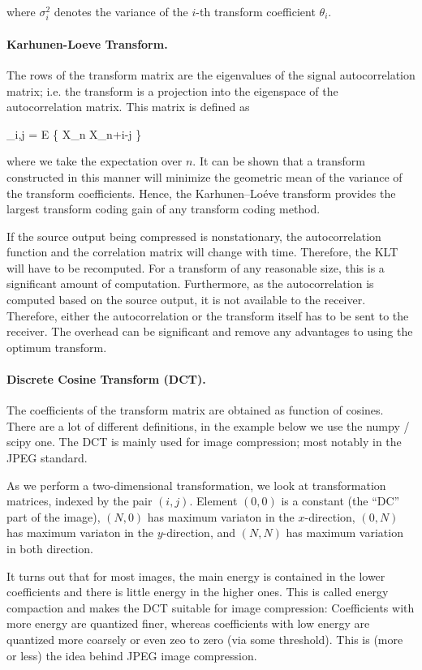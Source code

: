 where $\sigma_i^2$ denotes the variance of the $i$-th transform coefficient $\theta_i$.



\paragraph{Karhunen-Loeve Transform.} The rows of the transform matrix are the eigenvalues of the signal autocorrelation matrix; i.e. the transform is a projection into the eigenspace of the autocorrelation matrix. This matrix is defined as

\bee
[ \Rbf ]_{i,j} = E \{ X_n X_{n+i-j} \}
\eee

where we take the expectation over $n$. It can be shown that a transform constructed in this manner will minimize the geometric mean of the variance of the transform coefficients. Hence, the Karhunen–Loéve transform provides the largest transform coding gain of any transform coding method.

If the source output being compressed is nonstationary, the autocorrelation function and the correlation matrix will change with time. Therefore, the KLT will have to be recomputed. For a transform of any reasonable size, this is a significant amount of computation. Furthermore, as the autocorrelation is computed based on the source output, it is not available to the receiver. Therefore, either the autocorrelation or the transform itself has to be sent to the receiver. The overhead can be significant and remove any advantages to using the optimum transform.


\paragraph{Discrete Cosine Transform (DCT).}

The coefficients of the transform matrix are obtained as function of cosines. There are a lot of different definitions, in the example below we use the numpy / scipy one. The DCT is mainly used for image compression; most notably in the JPEG standard.

As we perform a two-dimensional transformation, we look at transformation matrices, indexed by the pair $(i,j)$. Element $(0,0)$ is a constant (the ``DC'' part of the image), $(N,0)$ has maximum variaton in the $x$-direction, $(0,N)$ has maximum variaton in the $y$-direction, and $(N,N)$ has maximum variation in both direction.

It turns out that for most images, the main energy is contained in the lower coefficients and there is little energy in the higher ones. This is called energy compaction and makes the DCT suitable for image compression: Coefficients with more energy are quantized finer, whereas coefficients with low energy are quantized more coarsely or even zeo to zero (via some threshold). This is (more or less) the idea behind JPEG image compression.


